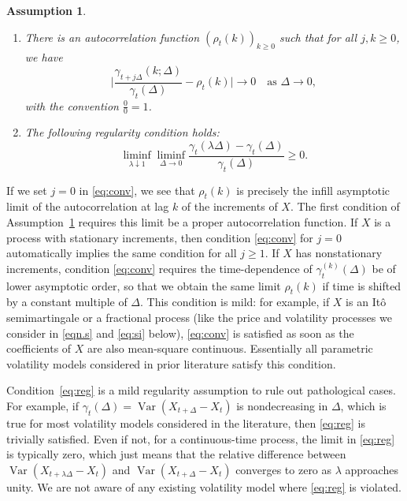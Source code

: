 \documentclass[ecta,nameyear,draft]{econsocart}
\makeatletter
\newtheorem{Assumption}{Assumption}
\renewcommand{\theAssumption}{\Alph{Assumption}}
\newcommand{\settheoremtag}[1]{%
	\let\oldtheAssumption\theAssumption%
	\renewcommand{\theAssumption}{#1}%
	\g@addto@macro\endAssumption{%
		\global\let\theAssumption\oldtheAssumption}%
}
\newcommand{\1}{\mathbf 1}
\DeclareMathOperator{\Var}{Var}
\numberwithin{equation}{section}
\makeatother
\begin{document}
\settheoremtag{$\gamma$}
\begin{Assumption}\label{ass:fgn}~
\begin{enumerate}
	\item[(i)] There is  an autocorrelation function $(\rho_t(k))_{k\geq0}$ such that for all $j,k\geq 0$, we have	\begin{equation}\label{eq:conv} 
		\Biggl\lvert	\frac{\gamma_{t+j\Delta}(k;\Delta)}{\gamma_t(\Delta)} - \rho_t(k)\Biggr\rvert\longrightarrow0\quad\text{as } \Delta\to0,
	\end{equation}
with the convention $\frac00=1$.
	\item[(ii)] The following regularity condition holds:
	\begin{equation}\label{eq:reg} 
		\liminf_{\lambda\downarrow1}\liminf_{\Delta\to0} \frac{\gamma_t(\lambda\Delta)-\gamma_t( \Delta)}{\gamma_t( \Delta)}\geq0.
	\end{equation}
\end{enumerate} 
\end{Assumption}

If we set $j=0$ in \eqref{eq:conv}, we see that $\rho_t(k)$ is precisely the infill asymptotic limit of the  autocorrelation at lag $k$ of the increments of $X$. The first condition of Assumption~\ref{ass:fgn}  requires this limit be a proper autocorrelation function. If $X$ is a process with stationary   increments, then condition \eqref{eq:conv} for $j=0$  automatically implies the same condition for all $j\geq1$. If $X$ has nonstationary increments, condition \eqref{eq:conv} requires  the time-dependence of $\gamma^{(k)}_t(\Delta)$  be of lower asymptotic order, so that we obtain the same limit $\rho_t(k)$ if time is shifted by a constant multiple of $\Delta$. This condition is mild: for example, if $X$ is an It\^o semimartingale or a fractional process (like the price and volatility processes we consider in \eqref{eqn.s} and \eqref{eq:si} below), \eqref{eq:conv} is satisfied as soon as the coefficients of $X$ are also mean-square continuous. Essentially all parametric volatility models considered in prior literature satisfy this condition.

Condition~\eqref{eq:reg} is a mild regularity assumption to rule out pathological cases. For example, if $\gamma_t(\Delta)=\Var(X_{t+\Delta}-X_t)$ is nondecreasing in $\Delta$, which is true for most volatility models considered in the literature, then \eqref{eq:reg} is trivially satisfied. Even if not, for a continuous-time process, the limit in \eqref{eq:reg} is typically zero, which just means that the relative difference between $\Var(X_{t+\lambda\Delta}-X_t)$ and $\Var(X_{t+\Delta}-X_t)$ converges to zero as $\lambda$ approaches unity. We are not aware of any existing volatility model where \eqref{eq:reg} is violated.
\end{document}
